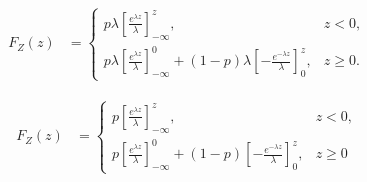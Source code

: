 \documentclass[answers]{exam}
\begin{document}
\begin{questions}
\begin{parts}
\begin{solution}
            \begin{align*}
                F_Z(z) & = \begin{cases}
                               p \lambda \left[\frac{e^{\lambda z}}{\lambda}\right]_{-\infty}^{z},                                                                        & z < 0,   \\
                               p \lambda \left[\frac{e^{\lambda z}}{\lambda}\right]_{-\infty}^{0} + (1 - p) \lambda \left[-\frac{e^{-\lambda z}}{\lambda}\right]_{0}^{z}, & z \ge 0.
                           \end{cases}
            \end{align*}

            \begin{align*}
                F_Z(z) & = \begin{cases}
                               p \left[\frac{e^{\lambda z}}{\lambda}\right]_{-\infty}^{z},                                                                & z < 0,  \\
                               p \left[\frac{e^{\lambda z}}{\lambda}\right]_{-\infty}^{0} + (1 - p) \left[-\frac{e^{-\lambda z}}{\lambda}\right]_{0}^{z}, & z \ge 0
                           \end{cases}
            \end{align*}
        \end{solution}
    \end{parts}
\end{questions}
\end{document}
